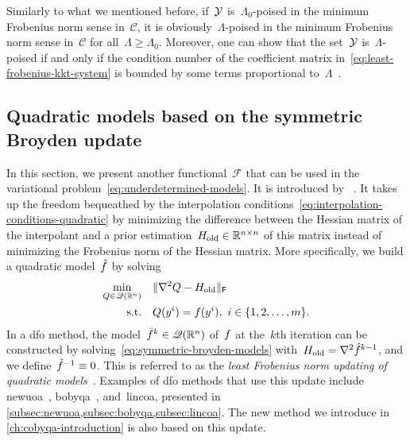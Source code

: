 Similarly to what we mentioned before, if~$\xpt$ is~$\Lambda_0$-poised in the minimum Frobenius norm sense in~$\mathcal{C}$, it is obviously~$\Lambda$-poised in the minimum Frobenius norm sense in~$\mathcal{C}$ for all~$\Lambda \ge \Lambda_0$.
Moreover, one can show that the set~$\xpt$ is~$\Lambda$-poised if and only if the condition number of the coefficient matrix in~\cref{eq:least-frobenius-kkt-system} is bounded by some terms proportional to~$\Lambda$~\cite[Thm.~5.8]{Conn_Scheinberg_Vicente_2009b}.

\subsection{Quadratic models based on the symmetric Broyden update}
\label{subsec:symmetric-broyden-updates}

In this section, we present another functional~$\mathcal{F}$ that can be used in the variational problem~\cref{eq:underdetermined-models}.
It is introduced by \citeauthor{Powell_2004b}~\cite{Powell_2004b}.
It takes up the freedom bequeathed by the interpolation conditions~\cref{eq:interpolation-conditions-quadratic} by minimizing the difference between the Hessian matrix of the interpolant and a prior estimation~$H_{\text{old}} \in \mathbb{R}^{n \times n}$ of this matrix instead of minimizing the Frobenius norm of the Hessian matrix.
More specifically, we build a quadratic model~$\objm$ by solving
\begin{subequations}
    \label{eq:symmetric-broyden-models}
    \begin{align}
        \min_{Q \in \mathscr{Q}(\mathbb{R}^n)} & \quad \lVert\nabla^2 Q - H_{\text{old}}\rVert_{\mathsf{F}}\\
        \text{s.t.}         & \quad Q(y^i) = f(y^i), ~ i \in \{1, 2, \dots, m\}.
    \end{align}
\end{subequations}
In a \gls{dfo} method, the model~$\objm[k] \in \qpoly$ of~$f$ at the~$k$th iteration can be constructed by solving~\cref{eq:symmetric-broyden-models} with~$H_{\text{old}} = \nabla^2 \objm[k - 1]$, and we define~$\objm[-1] \equiv 0$.
This is referred to as the \emph{least Frobenius norm updating of quadratic models}~\cite{Powell_2004b}.
Examples of \gls{dfo} methods that use this update include \gls{newuoa}~\cite{Powell_2006}, \gls{bobyqa}~\cite{Powell_2009}, and~\gls{lincoa}, presented in \cref{subsec:newuoa,subsec:bobyqa,subsec:lincoa}.
The new method we introduce in \cref{ch:cobyqa-introduction} is also based on this update.

